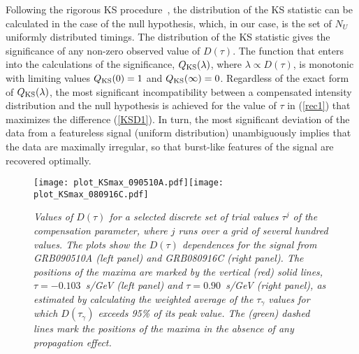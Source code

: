 \documentclass[12pt]{article}
\begin{document}
{Following the rigorous KS procedure~\cite{statBOOK1}, the distribution of the KS statistic can be calculated in the
case of the null hypothesis, which, in our case, is the set of $N_U$ uniformly distributed timings. The distribution of the KS statistic gives the significance
of any non-zero observed value of $D(\tau )$. The function that enters into the calculations
of the significance, $Q_{\rm KS}(\lambda)$, where $\lambda\propto D(\tau )$, is monotonic
with limiting values $Q_{\rm KS}(0)=1$ and $Q_{\rm KS}(\infty )=0$. Regardless
of the exact form of $Q_{\rm KS}(\lambda)$, the most significant incompatibility
between a compensated intensity distribution and the null hypothesis is achieved for the value
of $\tau $ in (\ref{rec1}) that maximizes the difference (\ref{KSD1}). In turn, the most significant
deviation of the data from a featureless signal (uniform distribution) unambiguously implies that
the data are maximally irregular, so that burst-like features of the signal are recovered optimally.

\begin{figure}
\centering
\texttt{[image: plot\_KSmax\_090510A.pdf]}\hspace{0cm}\texttt{[image: plot\_KSmax\_080916C.pdf]}
\vspace{-0.4cm}
\caption{\it Values of $D(\tau )$ for a selected discrete set of trial values $\tau ^j$ of the compensation parameter,
where $j$ runs over a grid of several hundred values. The plots show the $D(\tau )$ dependences for the signal
from  GRB090510A (left panel) and GRB080916C (right panel). The positions of the maxima are
marked by the vertical (red) solid lines, $\tau  =- 0.103$~s/GeV (left panel)
and $\tau  = 0.90$~s/GeV (right panel), as estimated by
calculating the weighted average of the $\tau_\gamma$ values for which $D(\tau_\gamma)$ exceeds 95\% of its peak value.
The (green) dashed lines mark the positions of the maxima in the absence of any propagation effect.
}
\label{fig:KSD_090510}
\end{figure}

}
\end{document}
